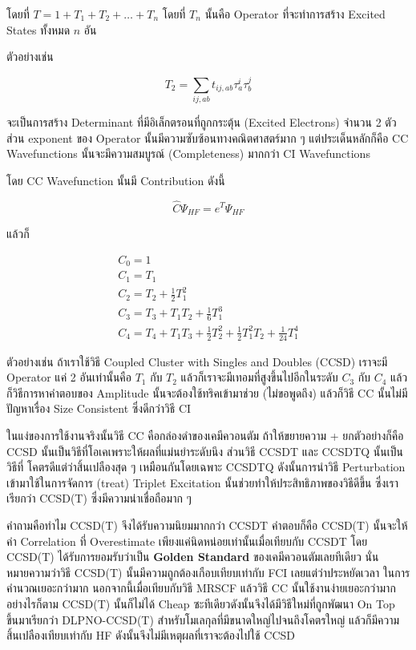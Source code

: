\noindent โดยที่ $T = 1 + T_{1} + T_{2} + \dots + T_{n}$ โดยที่ $T_{n}$ นั้นคือ
Operator ที่จะทำการสร้าง Excited States ทั้งหมด $n$ อัน

ตัวอย่างเช่น

\begin{equation}
    T_{2} = \sum_{ij,ab} t_{ij,ab} \tau^{i}_{a} \tau^{j}_{b}
\end{equation}

จะเป็นการสร้าง Determinant ที่มีอิเล็กตรอนที่ถูกกระตุ้น (Excited Electrons) จำนวน 2 ตัว
ส่วน exponent ของ Operator นั้นมีความซับซ้อนทางคณิตศาสตร์มาก ๆ แต่ประเด็นหลักก็คือ
CC Wavefunctions นั้นจะมีความสมบูรณ์ (Completeness) มากกว่า CI Wavefunctions

โดย CC Wavefunction นั้นมี Contribution ดังนี้

\begin{equation}
    \hat{C} \Psi_{HF} = e^{T} \Psi_{HF}
\end{equation}

แล้วก็

\begin{gather}
    C_{0} = 1 \\
    C_{1} = T_{1} \\
    C_{2} = T_{2} + \frac{1}{2}T^{2}_{1} \\
    C_{3} = T_{3} + T_{1}T_{2} + \frac{1}{6}T^{3}_{1} \\
    C_{4} = T_{4} + T_{1}T_{3} + \frac{1}{2}T^{2}_{2}
    + \frac{1}{2}T^{2}_{1} T_{2} + \frac{1}{24}T^{4}_{1}
\end{gather}

ตัวอย่างเช่น ถ้าเราใช้วิธี Coupled Cluster with Singles and Doubles (CCSD) เราจะมี
Operator แค่ 2 อันเท่านั้นคือ $T_{1}$ กับ $T_{2}$ แล้วก็เราจะมีเทอมที่สูงขึ้นไปอีกในระดับ
$C_{3}$ กับ $C_{4}$ แล้วก็วิธีการหาคำตอบของ Amplitude นั้นจะต้องใช้ทริคเข้ามาช่วย
(ไม่ขอพูดถึง) แล้วก็วิธี CC นั้นไม่มีปัญหาเรื่อง Size Consistent ซึ่งดีกว่าวิธี CI

ในแง่ของการใช้งานจริงนั้นวิธี CC คือกล่องดำของเคมีควอนตัม ถ้าให้ขยายความ + ยกตัวอย่างก็คือ
CCSD นั้นเป็นวิธีที่โอเคเพราะให้ผลที่แม่นยำระดับนึง ส่วนวิธี CCSDT และ CCSDTQ นั้นเป็นวิธีที่%
โคตรดีแต่ว่าสิ้นเปลืองสุด ๆ เหมือนกันโดยเฉพาะ CCSDTQ ดังนั้นการนำวิธี Perturbation
เข้ามาใช้ในการจัดการ (treat) Triplet Excitation นั้นช่วยทำให้ประสิทธิภาพของวิธีดีขึ้น
ซึ่งเราเรียกว่า CCSD(T) ซึ่งมีความน่าเชื่อถือมาก ๆ

คำถามคือทำไม CCSD(T) จึงได้รับความนิยมมากกว่า CCSDT คำตอบก็คือ CCSD(T) นั้นจะให้ค่า
Correlation ที่ Overestimate เพียงแค่นิดหน่อยเท่านั้นเมื่อเทียบกับ CCSDT โดย CCSD(T)
ได้รับการยอมรับว่าเป็น \textbf{Golden Standard} ของเคมีควอนตัมเลยทีเดียว
นั่นหมายความว่าวิธี CCSD(T) นั้นมีความถูกต้องเกือบเทียบเท่ากับ FCI เลยแต่ว่าประหยัดเวลา%
ในการคำนวณเยอะกว่ามาก นอกจากนี้เมื่อเทียบกับวิธี MRSCF แล้ววิธี CC นั้นใช้งานง่ายเยอะกว่ามาก
อย่างไรก็ตาม CCSD(T) นั้นก็ไม่ได้ Cheap ซะทีเดียวดังนั้นจึงได้มีวิธีใหม่ที่ถูกพัฒนา On Top
ขึ้นมาเรียกว่า DLPNO-CCSD(T) สำหรับโมเลกุลที่มีขนาดใหญ่ไปจนถึงโคตรใหญ่ แล้วก็มีความ%
สิ้นเปลืองเทียบเท่ากับ HF ดังนั้นจึงไม่มีเหตุผลที่เราจะต้องไปใช้ CCSD

